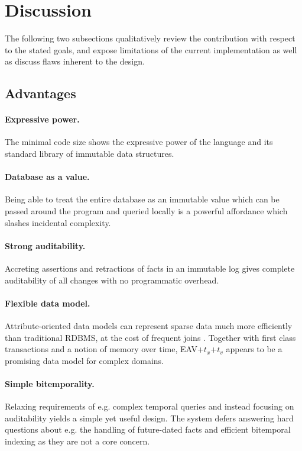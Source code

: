 \cleardoublepage
\section{Discussion}\label{sec:discussion}

The following two subsections qualitatively review the contribution with respect to the stated goals, and expose limitations of the current implementation as well as discuss flaws inherent to the design.

\subsection{Advantages}

\paragraph{Expressive power.} The minimal code size shows the expressive power of the language and its standard library of immutable data structures.

\paragraph{Database as a value.} Being able to treat the entire database as an immutable value which can be passed around the program and queried locally is a powerful affordance which slashes incidental complexity.

\paragraph{Strong auditability.} Accreting assertions and retractions of facts in an immutable log gives complete auditability of all changes with no programmatic overhead.

\paragraph{Flexible data model.} Attribute-oriented data models can represent sparse data much more efficiently than traditional RDBMS, at the cost of frequent joins \cite{gobel2019optimising}. Together with first class transactions and a notion of memory over time, EAV+$t_x$+$t_v$ appears to be a promising data model for complex domains.

\paragraph{Simple bitemporality.} Relaxing requirements of e.g. complex temporal queries and instead focusing on auditability yields a simple yet useful design. The system defers answering hard questions about e.g. the handling of future-dated facts and efficient bitemporal indexing as they are not a core concern.

